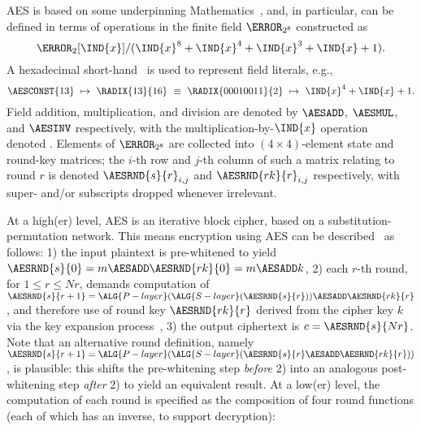 AES is based on some underpinning Mathematics~\cite[Section 4]{FIPS:197},
and, in particular, can be defined in terms of 
operations in the finite field $\F_{2^{  8}}$ constructed as
\[
\F_{2}[\IND{x}] / ( \IND{x}^{8} + \IND{x}^{4} + \IND{x}^{3} + \IND{x} + 1 ) .
\]
A hexadecimal short-hand~\cite[Section 3.2]{FIPS:197} is used to represent 
field literals, e.g.,
\[
\AESCONST{13} ~\mapsto~ \RADIX{13}{16} ~\equiv~ \RADIX{00010011}{2} ~\mapsto~ \IND{x}^4 + \IND{x} + 1 .
\]
Field 
      addition, 
multiplication, 
and  
      division
are denoted by
$\AESADD$,
$\AESMUL$,
and
$\AESINV$
respectively,
with the multiplication-by-$\IND{x}$ operation~\cite[Section 4.2.1]{FIPS:197} 
denoted .
Elements of $\F_{2^8}$ are collected into $( 4 \times 4 )$-element state
and round-key matrices; the $i$-th row and $j$-th column of such a matrix 
relating to round $r$ is denoted
$\AESRND {s}{r}_{i,j}$
and
$\AESRND{rk}{r}_{i,j}$
respectively, with super- and/or subscripts dropped whenever irrelevant.

At a high(er) level, 
AES is an iterative block cipher, based on a substitution-permutation network.
This means encryption using AES can be described~\cite[Section 5.2]{FIPS:197}
as follows:
1)    the  input  plaintext is pre-whitened to yield
      $\AESRND {s}{  0} = m \AESADD \AESRND{rk}{0} = m \AESADD k$,
2)    each $r$-th round, for $1 \leq r \leq Nr$, demands computation of
      $\AESRND {s}{r+1} = \ALG{P-layer}( \ALG{S-layer}( \AESRND{s}{r}                        ) ) \AESADD \AESRND{rk}{r}$,
      and therefore use of round key
      $\AESRND{rk}{r  }$
      derived from the cipher key $k$ via the key expansion process~\cite[Section 5.2]{FIPS:197},
3)    the output ciphertext is
      $c = \AESRND{s}{Nr}$.
Note that an alternative round definition, namely
      $\AESRND {s}{r+1} = \ALG{P-layer}( \ALG{S-layer}( \AESRND{s}{r} \AESADD \AESRND{rk}{r} ) )                       $ ,
is plausible: this shifts the 
 pre-whitening step {\em before} 2) 
into an analogous 
post-whitening step {\em  after} 2)
to yield an equivalent result.
At a  low(er) level,
the computation of each round is specified as the composition of four 
round functions (each of which has an inverse, to support decryption):

